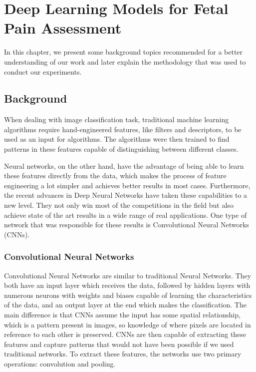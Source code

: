 \chapter{Deep Learning Models for Fetal Pain Assessment}

In this chapter, we present some background topics recommended for a better understanding of our work and later explain the methodology that was used to conduct our experiments.

\section{Background}

When dealing with image classification task, traditional machine learning algorithms require hand-engineered features, like filters and descriptors, to be used as an input for algorithms. The algorithms were then trained to find patterns in these features capable of distinguishing between different classes.

Neural networks, on the other hand, have the advantage of being able to learn these features directly from the data, which makes the process of feature engineering a lot simpler and achieves better results in most cases. Furthermore, the recent advances in Deep Neural Networks have taken these capabilities to a new level. They not only win most of the competitions in the field but also achieve state of the art results in a wide range of real applications. One type of network that was responsible for these results is Convolutional Neural Networks (CNNs).

\subsection{Convolutional Neural Networks}

Convolutional Neural Networks are similar to traditional Neural Networks. They both have an input layer which receives the data, followed by hidden layers with numerous neurons with weights and biases capable of learning the characteristics of the data, and an output layer at the end which makes the classification. The main difference is that CNNs assume the input has some spatial relationship, which is a pattern present in images, so knowledge of where pixels are located in reference to each other is preserved. CNNs are then capable of extracting these features and capture patterns that would not have been possible if we used traditional networks. To extract these features, the networks use two primary operations: convolution and pooling.

